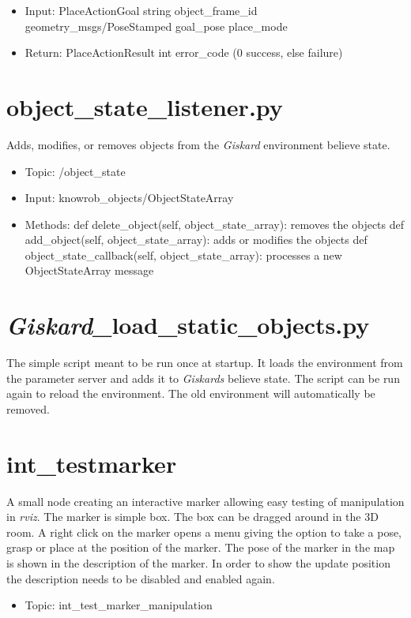 \documentclass[main.tex]{subfiles}
\begin{document}
			\begin{itemize}
				\item Input: PlaceActionGoal 
				\subitem string object\_frame\_id 
				\subitem geometry\_msgs/PoseStamped goal\_pose
				\subitem place\_mode
				\item Return: PlaceActionResult
				\subitem int error\_code (0 success, else failure)
			\end{itemize}
			
			\section{object\_state\_listener.py} 
			Adds, modifies, or removes objects from the \textit{Giskard} environment believe state.
			
			\begin{itemize}
				\item Topic: /object\_state
				\item Input: knowrob\_objects/ObjectStateArray
				\item Methods:
				\subitem def delete\_object(self, object\_state\_array): removes the objects
				\subitem def add\_object(self, object\_state\_array): adds or modifies the objects
				\subitem def object\_state\_callback(self, object\_state\_array): processes a new ObjectStateArray message
			\end{itemize}
			
			\section{\textit{Giskard}\_load\_static\_objects.py} 
			The simple script meant to be run once at startup. It loads the environment from the parameter server and adds it to \textit{Giskards} believe state. 
			The script can be run again to reload the environment. The old environment will automatically be removed.
			
			 
			\section{int\_testmarker}
			A small node creating an interactive marker allowing easy testing of manipulation in \textit{rviz}. The marker is simple box. The box can be dragged around in the 3D room. A right click on the marker opens a menu giving the option to take a pose, grasp or place at the position of the marker. The pose of the marker in the map is shown in the description of the marker. In order to show the update position the description needs to be disabled and enabled again.
			\begin{itemize}
				\item Topic: int\_test\_marker\_manipulation
			\end{itemize}

			
	\endgroup
\end{document}
